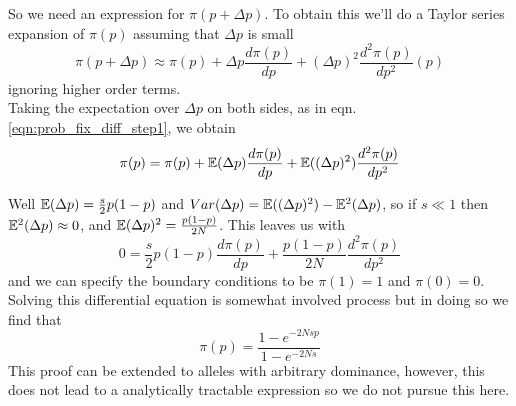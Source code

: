 So we need an expression for $\pi(p+\Delta p)$. To obtain this we'll
do a Taylor series expansion of $\pi(p)$ assuming that $\Delta p $ is small
\begin{equation}
\pi(p+\Delta p) \approx \pi(p) + \Delta p \frac{d\pi(p)}{dp} + (\Delta p)^2
\frac{d^2\pi(p)}{dp^2} (p)
\end{equation}
ignoring higher order terms.\\

Taking the expectation over $\Delta p $ on both sides, as in
eqn. \ref{eqn:prob_fix_diff_step1}, we obtain
\begin{equation}
\pi(p) = \pi(p) + \mathbb{E}(\Delta p) \frac{d\pi (p)}{dp} + \mathbb{E}((\Delta p)^2)
\frac{d^2\pi(p)}{dp^2}
\end{equation}

Well $\mathbb{E}(\Delta p) = \frac{s}{2}p(1-p)$ and $Var(\Delta p)= \mathbb{E}((\Delta
p)^2)-\mathbb{E}^2(\Delta p)$, so if $s \ll 1$ then $\mathbb{E}^2(\Delta p) \approx
0$, and $\mathbb{E}(\Delta p)^2 = \frac{p(1-p)}{2N}$. This leaves us with
\begin{equation}
0= \frac{s}{2}p(1-p)\frac{d\pi (p) }{dp} + \frac{p(1-p)}{2N}
\frac{d^2\pi (p) }{dp^2}
\end{equation}
and we can specify the boundary conditions to be $\pi(1)=1$ and $\pi(0)=0$. 
Solving this differential equation is somewhat involved process but in
doing so we find that
\begin{equation}
\pi(p) = \frac{1-e^{-2Ns p }}{1-e^{-2Ns}}
\end{equation}
This proof can be extended
to alleles with arbitrary dominance, however, this does not lead to a
analytically tractable expression so we do not pursue this here. 


